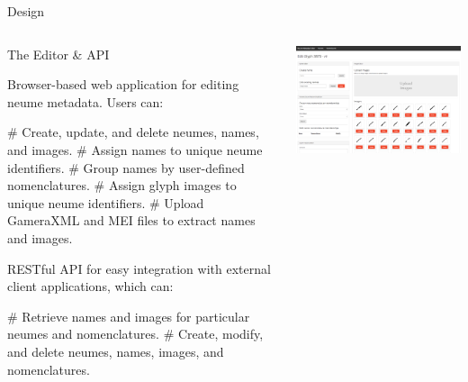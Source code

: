 \documentclass[final]{beamer}
\newlength{\onecolwid}
\newcommand{\blockSpace}{\vskip 0.75ex}
\begin{document}
\begin{frame}[fragile,t]
\begin{columns}
\begin{column}{\onecolwid}
\begin{block}{Design}
\end{block}



\end{column}

\end{columns}

\vspace{-1cm}

\begin{columns}
\begin{column}{\onecolwid}
\vspace{2cm}
\begin{block}{The Editor \& API}
\raggedright
Browser-based web application for editing neume metadata.  Users can:
\begin{easylist}[itemize]
# Create, update, and delete neumes, names, and images.
# Assign names to unique neume identifiers.
# Group names by user-defined nomenclatures.
# Assign glyph images to unique neume identifiers.
# Upload GameraXML and MEI files to extract names and images.
\end{easylist}

\vspace{1.5em}

RESTful API for easy integration with external client applications, which can:
\begin{easylist}[itemize]
# Retrieve names and images for particular neumes and nomenclatures.
# Create, modify, and delete  neumes, names, images, and nomenclatures.
\end{easylist}
\end{block}
\end{column}

\begin{column}{\onecolwid}
\begin{block}{}
\centering
\includegraphics[width=\onecolwid]{images/neume-edit-interface_cropped.png} 


\end{block}
\end{column}
\end{columns}
\end{frame}
\end{document}
